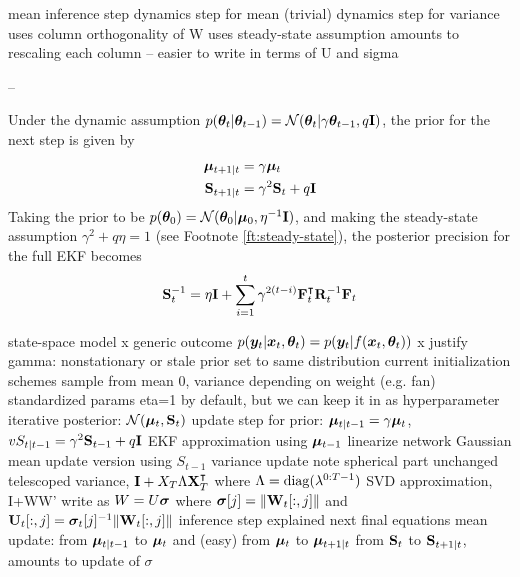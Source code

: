 mean inference step
dynamics step for mean (trivial)
dynamics step for variance
 uses column orthogonality of W
 uses steady-state assumption
 amounts to rescaling each column -- easier to write in terms of U and sigma

--

Under the dynamic assumption $p({\bm{\theta}}_t\vert{\bm{\theta}}_{t-1})=\mathcal{N}({\bm{\theta}}_t|\gamma{\bm{\theta}}_{t-1},q\mathbf{I})$, the prior for the next step is given by
\begin{align}
    \boldsymbol{\mu}_{t+1|t} &= \gamma\boldsymbol{\mu}_t \\
    \mathbf{S}_{t+1|t} &= \gamma^2\mathbf{S}_t + q\mathbf{I}
\end{align}
Taking the prior to be $p({\bm{\theta}}_0)=\mathcal{N}({\bm{\theta}}_0|\boldsymbol{\mu}_0,\eta^{-1}\mathbf{I})$, and making the steady-state assumption $\gamma^2 + q\eta = 1$ (see Footnote \ref{ft:steady-state}), the posterior precision for the full EKF becomes
\begin{align}
    \mathbf{S}_t^{-1} = \eta\mathbf{I} + \sum_{i=1}^t \gamma^{2(t-i)}\mathbf{F}_t^\intercal \mathbf{R}_t^{-1}\mathbf{F}_t
\end{align}

state-space model
 x generic outcome $p({\bm{y}}_t\vert {\bm{x}}_t,{\bm{\theta}}_t) = p({\bm{y}}_t\vert f({\bm{x}}_t,{\bm{\theta}}_t))$
 x justify gamma: nonstationary or stale
prior set to same distribution current initialization schemes sample from
 mean 0, variance depending on weight (e.g. fan)
 standardized params
 eta=1 by default, but we can keep it in as hyperparameter
iterative posterior: $\mathcal{N}(\boldsymbol{\mu}_t,\mathbf{S}_t)$
update step for prior: $\boldsymbol{\mu}_{t\vert t-1}=\gamma\boldsymbol{\mu}_t$, $vS_{t\vert t-1}=\gamma^2\mathbf{S}_{t-1}+q\mathbf{I}$
EKF approximation using $\boldsymbol{\mu}_{t-1}$
 linearize network
 Gaussian 
mean update
 version using $S_{t-1}$
variance update
 note spherical part unchanged
telescoped variance, $\mathbf{I}+X_T\Lambda \mathbf{X}_T^\intercal$ where $\Lambda=\mathrm{diag}(\lambda^{0:T-1})$
SVD approximation, I+WW'
 write as $W=U\boldsymbol{\sigma}$ where $\boldsymbol{\sigma}[j]=\Vert \mathbf{W}_t[:,j]\Vert$ and $\mathbf{U}_t[:,j]=\boldsymbol{\sigma}_t[j]^{-1}\Vert \mathbf{W}_t[:,j]\Vert$
 inference step explained next
final equations
 mean update: from $\boldsymbol{\mu}_{t\vert t-1}$ to $\boldsymbol{\mu}_t$ and (easy) from $\boldsymbol{\mu}_t$ to $\boldsymbol{\mu}_{t+1\vert t}$
 from $\mathbf{S}_t$ to $\mathbf{S}_{t+1\vert t}$, amounts to update of $\sigma$


